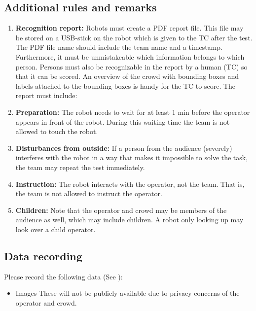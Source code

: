 \subsection{Additional rules and remarks}
\begin{enumerate}
\item \textbf{Recognition report:} 
  Robots must create a PDF report file.
  This file may be stored on a USB-stick on the robot which is given to the TC after the test. 
  The PDF file name should include the team name and a timestamp. 
  Furthermore, it must be unmistakeable which information belongs to which person. 
  Persons must also be recognizable in the report by a human (TC) so that it can be scored. 
  An overview of the crowd with bounding boxes and labels attached to the bounding boxes is handy for the TC to score.
  The report must include:

\item \textbf{Preparation:} The robot needs to wait for at least 1 min before the operator appears in front of the robot. During this waiting time the team is not allowed to touch the robot.
\item \textbf{Disturbances from outside:} If a person from the audience (severely) interferes with the robot in a way that makes it impossible to solve the task, the team may repeat the test immediately.
\item \textbf{Instruction:} The robot interacts with the operator, not the team. That is, the team is not allowed to instruct the operator.
\item \textbf{Children:} Note that the operator and crowd may be members of the audience as well, which may include children. A robot only looking up may look over a child operator. 
\end{enumerate}

\subsection{Data recording}
  Please record the following data (See ):
  \begin{itemize}
   \item Images These will not be publicly available due to privacy concerns of the operator and crowd. 
  \end{itemize}



